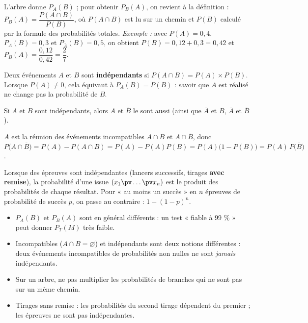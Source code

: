 \begin{savoirfaire}
L'arbre donne $P_A(B)$ ; pour obtenir $P_B(A)$, on revient à la définition : $P_B(A)=\dfrac{P(A\cap B)}{P(B)}$, où $P(A\cap B)$
est lu sur un chemin et $P(B)$ calculé par la formule des probabilités totales. \emph{Exemple :} avec $P(A)=0{,}4$, $P_A(B)=0{,}3$
et $P_{\overline A}(B)=0{,}5$, on obtient $P(B)=0{,}12+0{,}3=0{,}42$ et $P_B(A)=\dfrac{0{,}12}{0{,}42}=\dfrac27$.
\end{savoirfaire}


\begin{definition}
Deux événements $A$ et $B$ sont \textbf{indépendants} si $P(A\cap B)=P(A)\times P(B)$. Lorsque $P(A)\neq0$, cela équivaut à
$P_A(B)=P(B)$ : savoir que $A$ est réalisé ne change pas la probabilité de $B$.
\end{definition}

\begin{propriete}
Si $A$ et $B$ sont indépendants, alors $A$ et $\overline B$ le sont aussi (ainsi que $\overline A$ et $B$, $\overline A$ et $\overline B$).
\end{propriete}

\begin{demonstration}
$A$ est la réunion des événements incompatibles $A\cap B$ et $A\cap\overline B$, donc
$P\big(A\cap\overline B\big)=P(A)-P(A\cap B)=P(A)-P(A)P(B)=P(A)\big(1-P(B)\big)=P(A)\,P\big(\overline B\big)$.
\end{demonstration}

\begin{savoirfaire}
Lorsque des épreuves sont indépendantes (lancers successifs, tirages \textbf{avec remise}), la probabilité d'une issue
$(x_1\pv\dots\pv x_n)$ est le produit des probabilités de chaque résultat. Pour « au moins un succès » en $n$ épreuves de
probabilité de succès $p$, on passe au contraire : $1-(1-p)^{n}$.
\end{savoirfaire}

\begin{attention}
\begin{itemize}[label={\color{otOrange}\textbullet},leftmargin=1.4em,itemsep=0.6mm,topsep=0.5mm]
  \item $P_A(B)$ et $P_B(A)$ sont en général différents : un test « fiable à 99 \% » peut donner $P_T(M)$ très faible.
  \item Incompatibles ($A\cap B=\varnothing$) et indépendants sont deux notions différentes : deux événements incompatibles de
    probabilités non nulles ne sont \emph{jamais} indépendants.
  \item Sur un arbre, ne pas multiplier les probabilités de branches qui ne sont pas sur un même chemin.
  \item Tirages sans remise : les probabilités du second tirage dépendent du premier ; les épreuves ne sont pas indépendantes.
\end{itemize}
\end{attention}

